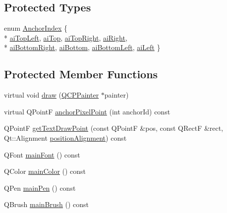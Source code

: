 \subsection*{Protected Types}
\begin{DoxyCompactItemize}
\item 
enum \hyperlink{classQCPItemText_a14a84e58f72519c8ae1d7a4a1dd23f21}{Anchor\+Index} \{ \\*
\hyperlink{classQCPItemText_a14a84e58f72519c8ae1d7a4a1dd23f21a30342ee15065715f045cb52eb77b904c}{ai\+Top\+Left}, 
\hyperlink{classQCPItemText_a14a84e58f72519c8ae1d7a4a1dd23f21a55ce9699c71db6d264eb669bb0eb9aff}{ai\+Top}, 
\hyperlink{classQCPItemText_a14a84e58f72519c8ae1d7a4a1dd23f21a7b6ff56fcad4c78db0b793a96fce9580}{ai\+Top\+Right}, 
\hyperlink{classQCPItemText_a14a84e58f72519c8ae1d7a4a1dd23f21ad4faa7def46db6df2fedd1926237b48f}{ai\+Right}, 
\\*
\hyperlink{classQCPItemText_a14a84e58f72519c8ae1d7a4a1dd23f21af2072f259730ef47aa7ad7519f3a0255}{ai\+Bottom\+Right}, 
\hyperlink{classQCPItemText_a14a84e58f72519c8ae1d7a4a1dd23f21a5773ad69b7f4cd2724ba46d8f31b0688}{ai\+Bottom}, 
\hyperlink{classQCPItemText_a14a84e58f72519c8ae1d7a4a1dd23f21a489ec73da5a18c15e98a4f9b17ed301f}{ai\+Bottom\+Left}, 
\hyperlink{classQCPItemText_a14a84e58f72519c8ae1d7a4a1dd23f21a7f1c1b8c574c753e300a4759915a9170}{ai\+Left}
 \}
\end{DoxyCompactItemize}
\subsection*{Protected Member Functions}
\begin{DoxyCompactItemize}
\item 
virtual void \hyperlink{classQCPItemText_a8793adb271ab79b4cf391dc55e9987f1}{draw} (\hyperlink{classQCPPainter}{Q\+C\+P\+Painter} $\ast$painter)
\item 
virtual Q\+PointF \hyperlink{classQCPItemText_ad248f988534a9d07bc7c220a2457142a}{anchor\+Pixel\+Point} (int anchor\+Id) const 
\item 
Q\+PointF \hyperlink{classQCPItemText_aa6e478b1ce198eace89157c4cacc3ddc}{get\+Text\+Draw\+Point} (const Q\+PointF \&pos, const Q\+RectF \&rect, Qt\+::\+Alignment \hyperlink{classQCPItemText_af13c6adc480f268116ae72196eb44b06}{position\+Alignment}) const 
\item 
Q\+Font \hyperlink{classQCPItemText_a23d391bd6471c45e73f45add67ede902}{main\+Font} () const 
\item 
Q\+Color \hyperlink{classQCPItemText_ad7bf17e4945cc86bbf9a36331da059a0}{main\+Color} () const 
\item 
Q\+Pen \hyperlink{classQCPItemText_a9ade32d362b22853659201c738269e2a}{main\+Pen} () const 
\item 
Q\+Brush \hyperlink{classQCPItemText_a10d6585a030633aa79d5ebc5a437f183}{main\+Brush} () const 
\end{DoxyCompactItemize}
